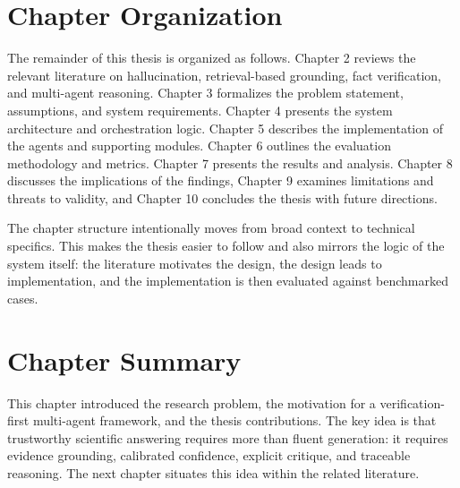 \section{Chapter Organization}

The remainder of this thesis is organized as follows. Chapter 2 reviews the relevant literature on hallucination, retrieval-based grounding, fact verification, and multi-agent reasoning. Chapter 3 formalizes the problem statement, assumptions, and system requirements. Chapter 4 presents the system architecture and orchestration logic. Chapter 5 describes the implementation of the agents and supporting modules. Chapter 6 outlines the evaluation methodology and metrics. Chapter 7 presents the results and analysis. Chapter 8 discusses the implications of the findings, Chapter 9 examines limitations and threats to validity, and Chapter 10 concludes the thesis with future directions.

The chapter structure intentionally moves from broad context to technical specifics. This makes the thesis easier to follow and also mirrors the logic of the system itself: the literature motivates the design, the design leads to implementation, and the implementation is then evaluated against benchmarked cases.

\section{Chapter Summary}

This chapter introduced the research problem, the motivation for a verification-first multi-agent framework, and the thesis contributions. The key idea is that trustworthy scientific answering requires more than fluent generation: it requires evidence grounding, calibrated confidence, explicit critique, and traceable reasoning. The next chapter situates this idea within the related literature.

